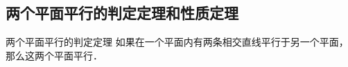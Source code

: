 \subsection{两个平面平行的判定定理和性质定理}
\begin{blk}{两个平面平行的判定定理} 
  如果在一个平面内有两条相交直线平行于另一个平面，那么这两个平面平行．
\end{blk}






\begin{example}
    
\end{example}
\begin{solution}
    
\end{solution}


\begin{example}
    
\end{example}

\begin{solution}
    
\end{solution}

\begin{example}
    
\end{example}
\begin{solution}
    
\end{solution}


\begin{example}
    
\end{example}

\begin{solution}
    
\end{solution}


\begin{example}
    
\end{example}

\begin{solution}
    
\end{solution}



\begin{example}
    
\end{example}

